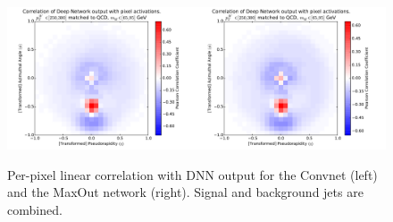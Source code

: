 \begin{figure}[!htbp]
  \centering
\includegraphics[width=0.5\textwidth]{figures/pixel-activations-corr-cnn.pdf}\includegraphics[width=0.5\textwidth]{figures/pixel-activations-corr-maxout.pdf}
  \caption{Per-pixel linear correlation with DNN output for the Convnet (left) and the MaxOut network (right).  Signal and background jets are combined.}
  \label{fig:corr}
\end{figure}

